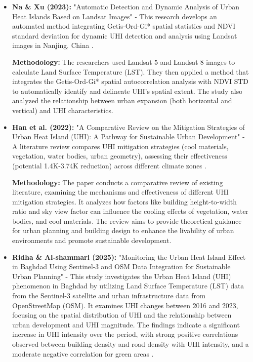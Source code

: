 \documentclass{article}
\begin{document}
\begin{itemize}
    \vspace{0.3cm}

    \item \textbf{Na \& Xu (2023):} "{Automatic Detection and Dynamic Analysis of Urban Heat Islands Based on Landsat Images}" - This research develops an automated method integrating Getis-Ord-Gi* spatial statistics and NDVI standard deviation for dynamic UHI detection and analysis using Landsat images in Nanjing, China \parencite{Na_2023}.

    \textbf{Methodology:} The researchers used Landsat 5 and Landsat 8 images to calculate Land Surface Temperature (LST). They then applied a method that integrates the Getis-Ord-Gi* spatial autocorrelation analysis with NDVI STD to automatically identify and delineate UHI's spatial extent. The study also analyzed the relationship between urban expansion (both horizontal and vertical) and UHI characteristics.

    \vspace{0.3cm}

    \item \textbf{Han et al. (2022):} "{A Comparative Review on the Mitigation Strategies of Urban Heat Island (UHI): A Pathway for Sustainable Urban Development}" - A literature review compares UHI mitigation strategies (cool materials, vegetation, water bodies, urban geometry), assessing their effectiveness (potential 1.4K-3.74K reduction) across different climate zones \parencite{Han_2022}.

    \textbf{Methodology:} The paper conducts a comparative review of existing literature, examining the mechanisms and effectiveness of different UHI mitigation strategies. It analyzes how factors like building height-to-width ratio and sky view factor can influence the cooling effects of vegetation, water bodies, and cool materials. The review aims to provide theoretical guidance for urban planning and building design to enhance the livability of urban environments and promote sustainable development.

    \item \textbf{Ridha \& Al-shammari (2025):} "{Monitoring the Urban Heat Island Effect in Baghdad Using Sentinel-3 and OSM Data Integration for Sustainable Urban Planning}" - This study investigates the Urban Heat Island (UHI) phenomenon in Baghdad by utilizing Land Surface Temperature (LST) data from the Sentinel-3 satellite and urban infrastructure data from OpenStreetMap (OSM). It examines UHI changes between 2016 and 2023, focusing on the spatial distribution of UHI and the relationship between urban development and UHI magnitude. The findings indicate a significant increase in UHI intensity over the period, with strong positive correlations observed between building density and road density with UHI intensity, and a moderate negative correlation for green areas \parencite{RidhaAlshammari2025Baghdad}.


\end{itemize}
\end{document}
